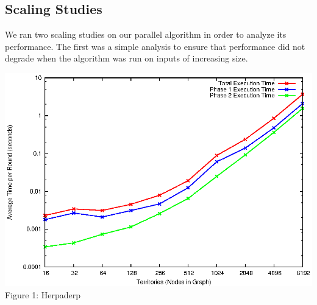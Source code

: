 \documentclass[10pt]{article}
\begin{document}
\begin{multicols}{2}
		\subsection*{Scaling Studies}
		We ran two scaling studies on our parallel algorithm in order to analyze its performance.
		The first was a simple analysis to ensure that performance did not degrade when the algorithm was run on inputs of increasing size.
		\begin{center}
			\includegraphics[width=.45\textwidth]{graphs.eps}
			\small{Figure 1: Herpaderp}
		\end{center}


\end{multicols}
\end{document}
